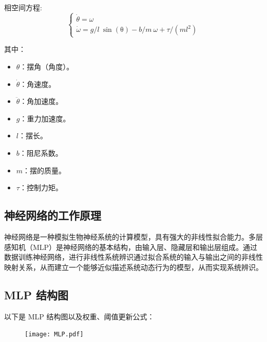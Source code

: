 \documentclass[12pt, AutoFakeBold=4]{ctexart}
\begin{document}
	相空间方程:
	\begin{equation}
		\left\{
		\begin{array}{c}
			\dot{\theta}=\omega\\
			\dot{\omega}= g/l \ \mathrm{\sin(\theta)}
			-b/m\ \omega + \tau/(m l^2)
		\end{array}
		\right.
	\end{equation}
	
	其中：
	\begin{itemize}
		\item \(\theta\)：摆角（角度）。
		\item \(\dot{\theta}\)：角速度。
		\item \(\ddot{\theta}\)：角加速度。
		\item \(g\)：重力加速度。
		\item \(l\)：摆长。
		\item \(b\)：阻尼系数。
		\item \(m\)：摆的质量。
		\item \(\tau\)：控制力矩。
	\end{itemize}
	
	
	\subsection{神经网络的工作原理}
神经网络是一种模拟生物神经系统的计算模型，具有强大的非线性拟合能力。多层感知机（MLP）是神经网络的基本结构，由输入层、隐藏层和输出层组成\cite{ai_book2}。通过数据训练神经网络，进行非线性系统辨识通过拟合系统的输入与输出之间的非线性映射关系，从而建立一个能够近似描述系统动态行为的模型，从而实现系统辨识。

\subsection{MLP 结构图}
以下是 MLP 结构图以及权重、阈值更新公式：\par
\begin{figure}[H]
	\centering
	\texttt{[image: MLP.pdf]}
\end{figure}
	
\end{document}
